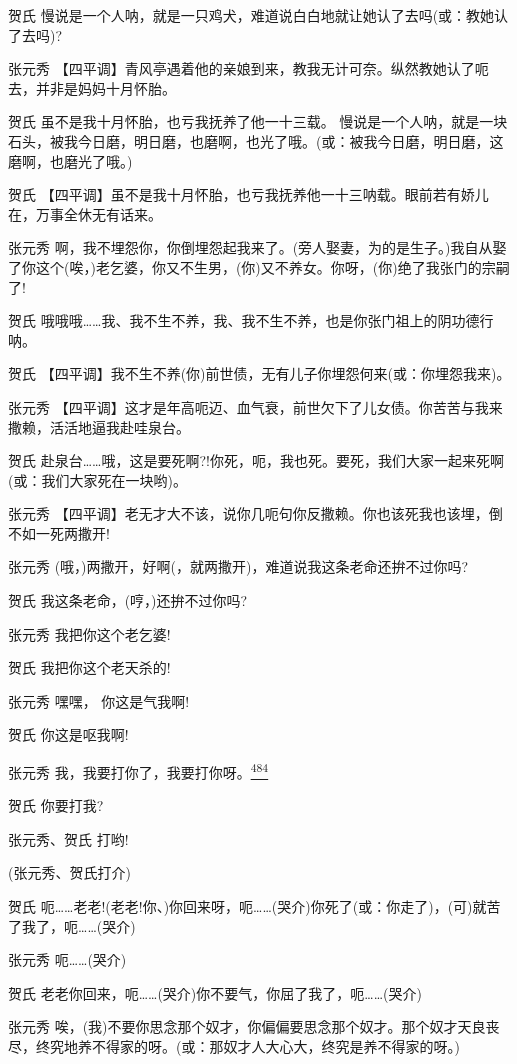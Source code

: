 贺氏
慢说是一个人呐，就是一只鸡犬，难道说白白地就让她认了去吗(或：教她认了去吗)?

张元秀
【四平调】青风亭遇着他的亲娘到来，教我无计可奈。纵然教她认了呃去，并非是妈妈十月怀胎。

贺氏 虽不是我十月怀胎，也亏我抚养了他一十三载。
慢说是一个人呐，就是一块石头，被我今日磨，明日磨，也磨啊，也光了哦。(或：被我今日磨，明日磨，这磨啊，也磨光了哦。)

贺氏
【四平调】虽不是我十月怀胎，也亏我抚养他一十三呐载。眼前若有娇儿在，万事全休无有话来。

张元秀
啊，我不埋怨你，你倒埋怨起我来了。(旁人娶妻，为的是生子。)我自从娶了你这个(唉，)老乞婆，你又不生男，(你)又不养女。你呀，(你)绝了我张门的宗嗣了!

贺氏
哦哦哦\ldots{}\ldots{}我、我不生不养，我、我不生不养，也是你张门祖上的阴功德行呐。

贺氏
【四平调】我不生不养(你)前世债，无有儿子你埋怨何来(或：你埋怨我来)。

张元秀
【四平调】这才是年高呃迈、血气衰，前世欠下了儿女债。你苦苦与我来撒赖，活活地逼我赴哇泉台。

贺氏
赴泉台\ldots{}\ldots{}哦，这是要死啊?!你死，呃，我也死。要死，我们大家一起来死啊(或：我们大家死在一块哟)。

张元秀
【四平调】老无才大不该，说你几呃句你反撒赖。你也该死我也该埋，倒不如一死两撒开!

张元秀 (哦，)两撒开，好啊(，就两撒开)，难道说我这条老命还拚不过你吗?

贺氏 我这条老命，(哼，)还拚不过你吗?

张元秀 我把你这个老乞婆!

贺氏 我把你这个老天杀的!

张元秀 嘿嘿， 你这是气我啊!

贺氏 你这是呕我啊!

张元秀
我，我要打你了，我要打你呀。\protect\hyperlink{fn484}{\textsuperscript{484}}

贺氏 你要打我?

张元秀、贺氏 打哟!

(张元秀、贺氏打介)

贺氏
呃\ldots{}\ldots{}老老!(老老!你、)你回来呀，呃\ldots{}\ldots{}(哭介)你死了(或：你走了)，(可)就苦了我了，呃\ldots{}\ldots{}(哭介)

张元秀 呃\ldots{}\ldots{}(哭介)

贺氏
老老你回来，呃\ldots{}\ldots{}(哭介)你不要气，你屈了我了，呃\ldots{}\ldots{}(哭介)

张元秀
唉，(我)不要你思念那个奴才，你偏偏要思念那个奴才。那个奴才天良丧尽，终究地养不得家的呀。(或：那奴才人大心大，终究是养不得家的呀。)

